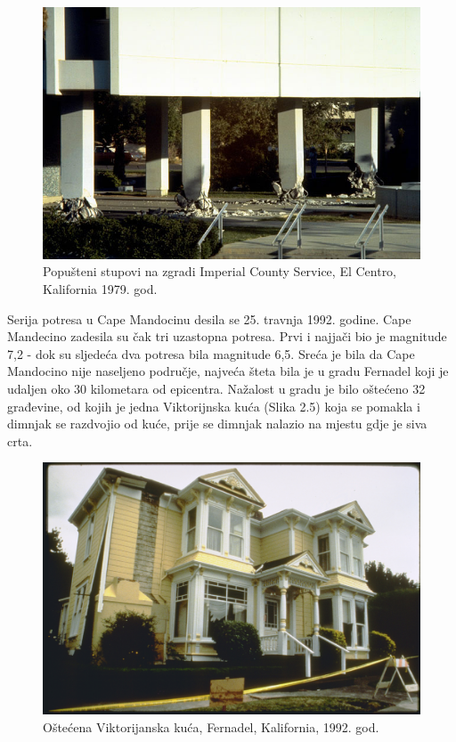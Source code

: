 \documentclass[12pt]{book}
\begin{document}
\begin{figure}[h]
	\centering
	\includegraphics[width=0.8\linewidth]{Slike/imperial_valley_szupovi}
	\caption{Popušteni stupovi na zgradi Imperial County Service, El Centro, Kalifornia 1979. god. \cite{imperial_county_slika}}
	\label{fig:imperialvalleyszupovi}
\end{figure}

\newpage

Serija potresa u Cape Mandocinu desila se 25. travnja 1992. godine. Cape Mandecino zadesila su čak tri uzastopna potresa. Prvi i najjači bio je magnitude 7,2 - dok su sljedeća dva potresa bila magnitude 6,5. Sreća je bila da Cape Mandocino nije naseljeno područje, najveća šteta bila je u gradu Fernadel koji je udaljen oko 30 kilometara od epicentra. Nažalost u gradu je bilo oštećeno 32 građevine, od kojih je jedna Viktorijnska kuća (Slika 2.5) koja se pomakla i dimnjak se razdvojio od kuće, prije se dimnjak nalazio na mjestu gdje je siva crta. \cite{cape_mendocino}


\begin{figure}[h]
	\centering
	\includegraphics[width=0.8\linewidth]{Slike/cape_mandecino}
	\caption{Oštećena Viktorijanska kuća, Fernadel, Kalifornia, 1992. god. \cite{Cape_mandocino_slika}}
	\label{fig:capemandecino}
\end{figure}
\end{document}

